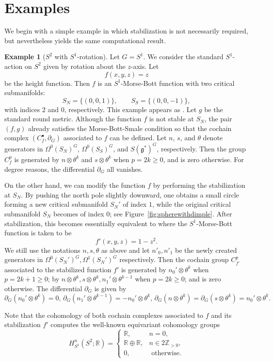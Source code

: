 \documentclass[11pt]{amsart}
\theoremstyle{definition}
\newtheorem{example}[theorem]{Example}
\numberwithin{equation}{subsection}
\begin{document}
\section{Examples}\label{section:example}

We begin with a simple example in which stabilization is not necessarily required, but nevertheless 
yields the same computational result.

\begin{example}[$S^2$ with $S^1$-rotation]\label{example:sphere}
Let $G=S^1$. We consider the standard $S^1$-action on $S^2$ given by rotation about the $z$-axis.  
Let
\[
f(x,y,z) = z
\]
be the height function. Then $f$ is an $S^1$-Morse-Bott function with two critical submanifolds:
\[
S_N = \{(0,0,1)\}, \qquad S_S = \{(0,0,-1)\},
\]
with indices $2$ and $0$, respectively.  This example appears as \cite[Example~5.4.1 (1)]{AustinBraam}.  
Let $g$ be the standard round metric. Although the function $f$ is not stable at $S_N$, the pair $(f,g)$ already satisfies the Morse-Bott-Smale condition so that the cochain complex $(C_f^{\bullet},\partial_G)$ associated to $f$ can be defined. Let $n$, $s$, and $\theta$ denote generators in 
$\Omega^{0}(S_N)^{G}$, $\Omega^{0}(S_S)^{G}$, and $S(\mathfrak{g}^{*})^{G}$, 
respectively. Then the group $C_f^{p}$ is generated by 
$n\otimes \theta^{k}$ and $s\otimes \theta^{k}$ when $p=2k\ge 0$, and is zero 
otherwise. For degree reasons, the differential $\partial_G$ all vanishes.


On the other hand, we can modify the function $f$ by performing the stabilization at $S_N$. By pushing the north pole slightly downward, one obtains a small circle forming a new critical submanifold $S_N'$ of index $1$, while the original critical submanifold $S_N$ becomes of index $0$; see Figure~\ref{fig:spherewithdimple}. 
After stabilization, this becomes essentially equivalent to \cite[Example~5.4.1 (2)]{AustinBraam} where the $S^1$-Morse-Bott function is taken to be \[f'(x,y,z)=1-z^2.\]
We still use the notations $n,s,\theta$ as above and let $n'_0,n'_1$ be the newly created generators in $\Omega^0(S_N')^G,\Omega^1(S_N')^G$ respectively. Then the cochain group $C_{f'}^p$ associated to the stabilized function $f'$ is generated by $n_0'\otimes \theta^k$ when $p=2k+1\geq 0$; by $n\otimes \theta^k,s\otimes \theta^k, n_1'\otimes \theta^{k-1}$ when $p=2k\geq 0$; and is zero otherwise. The differential  $\partial_{G}$ is given by
\[\partial_{G}(n_0'\otimes \theta^k)=0,\,\partial_{G}(n_1'\otimes \theta^{k-1})=-n_0'\otimes\theta^k,\,\partial_{G}(n\otimes \theta^k)=\partial_{G}(s\otimes\theta^k)=n_0'\otimes\theta^k.\]

Note that the cohomology of both cochain complexes associated to $f$ and its stabilization $f'$ computes the well-known equivariant cohomology groups 
\[
H_{S^1}^n(S^2;\mathbb{R}) =
\begin{cases}
\mathbb{R}, & n=0,\\
\mathbb{R}\oplus\mathbb{R}, & n\in 2\mathbb{Z}_{>0},\\
0, & \text{ otherwise}.
\end{cases}
\]
\end{example}
\end{document}
